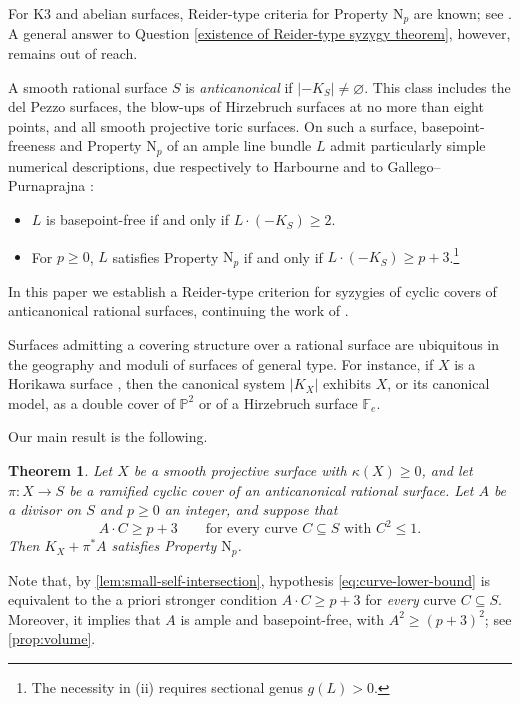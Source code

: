 \documentclass[11pt,reqno]{amsart}
\numberwithin{equation}{section}
\newtheorem{theorem}{Theorem}[section]
\theoremstyle{remark}
\newcommand{\prj}[1]{\mathbb{P}^{#1}}
\newcommand{\NP}{\mathrm N}
\begin{document}
For K3 and abelian surfaces, Reider-type criteria for Property $\NP_p$ are known; see \cite{AKL19, KL19, Ito18, LSW26}. A general answer to Question \ref{existence of Reider-type syzygy theorem}, however, remains out of reach.

A smooth rational surface \(S\) is \emph{anticanonical} if \(|-K_S|\ne\varnothing\). This class includes the del Pezzo surfaces, the blow-ups of Hirzebruch surfaces at no more than eight points, and all smooth projective toric surfaces. On such a surface, basepoint-freeness and Property $\NP_p$ of an ample line bundle $L$ admit particularly simple numerical descriptions, due respectively to Harbourne \cite[Theorem III.1]{Harbourne} and to Gallego--Purnaprajna \cite[Theorem 1.3]{GP01}:
\begin{itemize}
    \item[(i)] $L$ is basepoint-free if and only if $L\cdot (-K_S)\ge 2$.
    \item[(ii)] For $p\ge 0$, $L$ satisfies Property $\NP_p$ if and only if $L\cdot (-K_S)\ge p+3$.\footnote{The necessity in (ii) requires sectional genus $g(L)>0$.}
\end{itemize}

In this paper we establish a Reider-type criterion for syzygies of cyclic covers of anticanonical rational surfaces, continuing the work of \cite{RS17, Song}.

Surfaces admitting a covering structure over a rational surface are ubiquitous in the geography and moduli of surfaces of general type. For instance, if $X$ is a Horikawa surface \cite{Horikawa76}, then the canonical system $|K_X|$ exhibits $X$, or its canonical model, as a double cover of $\prj{2}$ or of a Hirzebruch surface $\mathbb{F}_e$.

Our main result is the following.
\begin{theorem}\label{thm:main}
Let
\(X\) be a smooth projective surface with $\kappa(X)\ge 0$, and let \(\pi\colon X\to S\) be a
ramified cyclic cover of an anticanonical rational surface. Let \(A\) be a divisor on \(S\) and \(p\ge 0\) an integer, and suppose that
\begin{equation}\label{eq:curve-lower-bound}
 A\cdot C\geq p+3
 \qquad\text{for every curve }C\subseteq S \text{ with }C^2\le 1.
\end{equation}
Then \(K_X+\pi^*A\) satisfies Property \(\NP_p\).
\end{theorem}

Note that, by \cref{lem:small-self-intersection}, hypothesis \eqref{eq:curve-lower-bound} is equivalent to the a priori stronger condition $A\cdot C\ge p+3$ for \emph{every} curve $C\subseteq S$. Moreover, it implies that \(A\) is ample and basepoint-free, with \(A^2\geq(p+3)^2\); see \cref{prop:volume}.
\end{document}
